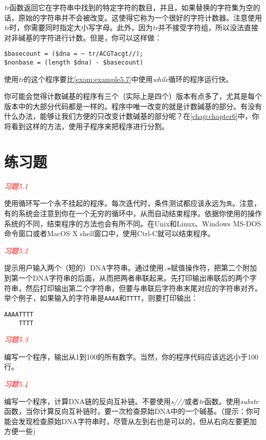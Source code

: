 \textit{tr}函数返回它在字符串中找到的特定字符的数目，并且，如果替换的字符集为空的话，原始的字符串并不会被改变。这使得它称为一个很好的字符计数器。注意使用\textit{tr}时，你需要同时指定大小写字母。此外，因为\textit{tr}并不接受字符组，所以没法直接对非碱基的字符进行计数。但是，你可以这样做：

\begin{lstlisting}
$basecount = ($dna = ~ tr/ACGTacgt//);
$nonbase = (length $dna) - $basecount)
\end{lstlisting}

使用\textit{tr}的这个程序要比\autoref{exam:example5.7}中使用\textit{while}循环的程序运行快。

你可能会觉得计数碱基的程序有三个（实际上是四个）版本有点多了，尤其是每个版本中的大部分代码都是一样的。程序中唯一改变的就是计数碱基的部分。有没有什么办法，能够让我们方便的只改变计数碱基的部分呢？在\autoref{chap:chapter6}中，你将看到这样的方法，使用子程序来把程序进行分割。

\section{练习题}
\textcolor{red}{\textit{习题5.1}}
\begin{adjustwidth}{2em}{}
使用循环写一个永不挂起的程序。每次迭代时，条件测试都应该永远为\verb|真|。注意，有的系统会注意到你在一个无穷的循环中，从而自动结束程序。依据你使用的操作系统的不同，结束程序的方法也会有所不同。在Unix和Linux、Windows
MS-DOS命令窗口或者MacOS X shell窗口中，使用Ctrl-C就可以结束程序。
\end{adjustwidth}

\textcolor{red}{\textit{习题5.2}}
\begin{adjustwidth}{2em}{}
提示用户输入两个（短的）DNA字符串。通过使用\verb|.=|赋值操作符，把第二个附加到第一个DNA字符串的后面，从而把两者串联起来。先打印输出串联后的两个字符串，然后打印输出第二个字符串，但要与串联后字符串末尾对应的字符串对齐。举个例子，如果输入的字符串是\verb|AAAA|和\verb|TTTT|，则要打印输出：
\begin{verbatim}
AAAATTTT
    TTTT
\end{verbatim}
\end{adjustwidth}

\textcolor{red}{\textit{习题5.3}}
\begin{adjustwidth}{2em}{}
编写一个程序，输出从1到100的所有数字。当然，你的程序代码应该远远小于100行。
\end{adjustwidth}

\textcolor{red}{\textit{习题5.4}}
\begin{adjustwidth}{2em}{}
编写一个程序，计算DNA链的反向互补链。不要使用\textit{s///}或者\textit{tr}函数。使用\textit{substr}函数，当你计算反向互补链时，要一次检查原始DNA中的一个碱基。（提示：你可能会发现检查原始DNA字符串时，尽管从左到右也是可以的，但从右向左要更加方便一些) 
\end{adjustwidth}

